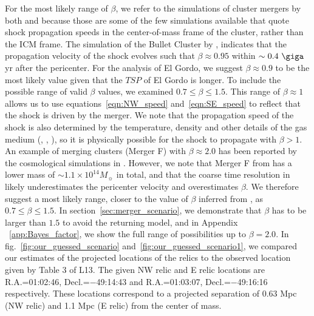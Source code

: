 \documentclass[letterpaper,useAMS,usenatbib]{mn2e}
\begin{document}
For the most likely range of $\beta$, we refer to the
simulations of cluster mergers by both \cite{Springel2007} and
\cite{Paul2011b} because those are some of the few simulations available that
quote shock propagation speeds in the center-of-mass frame of the cluster,
rather than the ICM frame. 
The simulation of the Bullet Cluster by \cite{Springel2007}, 
indicates that the propagation velocity of the shock evolves such that $\beta \approx 0.95$ within
$\sim 0.4~\giga$yr after the pericenter. For the analysis of El Gordo,
we suggest $\beta \approx 0.9$ to be the most likely value given that the $TSP$ of
El Gordo is longer. 
To include the possible range of valid $\beta$ values,
we examined $0.7 \leq \beta \leq 1.5$. This range of $\beta \approx 1$ allows us to use  
equations~\ref{eqn:NW_speed} and~\ref{eqn:SE_speed} to reflect that the
shock is driven by the merger. We note that the propagation speed of the
shock is also determined by the temperature, density and other details of
the gas medium (\citealt{Prokhorov2007}, \citealt{Springel2007},
\citealt{Milosavljevic07}), so it is physically possible for the shock to
propagate with $\beta > 1$. An example of
merging clusters (Merger F) with $\beta \approx 2.0$ has been reported by the cosmological
simulations in \citealt{Paul2011b}. 
However, we note that Merger F from \citealt{Paul2011b} has a lower mass of
$\sim 1.1 \times 10^{14} M_{\sun}$ in total, and that the coarse time resolution
in \citealt{Paul2011b} likely underestimates the
pericenter velocity and overestimates $\beta$.
We therefore
suggest a most likely range, closer to the value of $\beta$ inferred from
\cite{Springel2007}, as $0.7 \leq \beta \leq 1.5$.
In section~\ref{sec:merger_scenario}, we demonstrate that $\beta$ has to be
larger than $1.5$ to 
avoid the returning model, and in Appendix
~\ref{app:Bayes_factor}, we show the full range of possibilities up to
$\beta = 2.0$. 
In fig.~\ref{fig:our_guessed_scenario} and~\ref{fig:our_guessed_scenario1}, we compared our estimates of the projected locations of the relics to the
observed location given by Table 3 of L13. The given NW relic and E relic
locations are R.A.=01:02:46, Decl.=$-$49:14:43 and R.A.=01:03:07,
Decl.=$-$49:16:16
respectively. These locations correspond to a projected separation of 0.63 Mpc
(NW relic) and 1.1 Mpc (E relic) from the center of mass.

\label{sec:positionprior}
\end{document}
